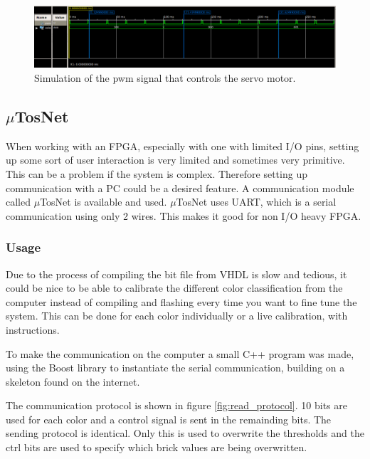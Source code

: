 \begin{figure}[h]
\centering
    \includegraphics[width=0.9\linewidth]{img/pwm_simulation}
    \caption{Simulation of the pwm signal that controls the servo motor.}
    \label{fig:pwm_simulation}
\end{figure}

\subsection{$\mu$TosNet}
When working with an FPGA, especially with one with limited I/O pins, setting up some sort of user interaction is very limited and sometimes very primitive. This can be a problem if the system is complex. Therefore setting up communication with a PC could be a desired feature. A communication module called $\mu$TosNet is available and used. $\mu$TosNet uses UART, which is a serial communication using only 2 wires. This makes it good for non I/O heavy FPGA. 

\subsubsection{Usage}
Due to the process of compiling the bit file from VHDL is slow and tedious, it could be nice to be able to calibrate the different color classification from the computer instead of compiling and flashing every time you want to fine tune the system. This can be done for each color individually or a live calibration, with instructions.

To make the communication on the computer a small C++ program was made, using the Boost library to instantiate the serial communication, building on a skeleton found on the internet\cite{url:serial}.

The communication protocol is shown in figure \ref{fig:read_protocol}. 10 bits are used for each color and a control signal is sent in the remainding bits. %
The sending protocol is identical. Only this is used to overwrite the thresholds and the ctrl bits are used to specify which brick values are being overwritten.


